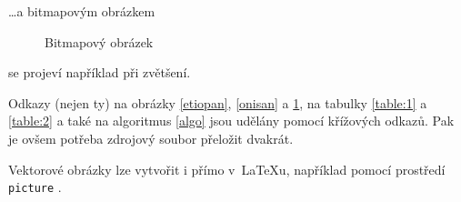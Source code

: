 \documentclass[11pt, a4paper]{article}
\begin{document}
    \noindent \dots a bitmapovým obrázkem
    \begin{figure}[h]
        \begin{center}
        \caption{Bitmapový obrázek}
        \label{onisan2}
        \end{center}
    \end{figure}
    
    \noindent se projeví například při zvětšení.
    
    Odkazy (nejen ty) na obrázky \ref*{etiopan}, \ref*{onisan} a \ref*{onisan2}, na tabulky \ref*{table:1} a \ref*{table:2} a také na algoritmus \ref*{algo} jsou udělány pomocí křížových odkazů. Pak je ovšem potřeba zdrojový soubor přeložit dvakrát.
    
    Vektorové obrázky lze vytvořit i přímo v~\LaTeX{u}, například pomocí prostředí\texttt{ picture} .
    
\end{document}
